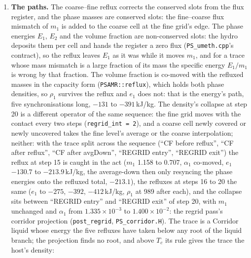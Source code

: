 \documentclass[11pt,a4paper]{article}
\newcommand{\code}[1]{\texttt{\small #1}}
\begin{document}
\begin{enumerate}[nosep]
      $-391$\,kJ/kg, the liquid's density untouched.  Then at the
      synchronisation into step 20 $\alpha_1$ jumps from $1.8\times10^{-3}$
      to $1.40\times10^{-2}$ while $m_1$ falls from 1.82 to 1.32, and
      $\rho_1$ collapses from 989 to 94\,kg/m$^3$; from there the cell
      is the degraded trace of follow-up 21.
\item \textbf{The paths.}  The coarse--fine reflux corrects the
      conserved slots from the flux register, and the phase masses are
      conserved slots: the fine--coarse flux mismatch of $m_1$ is added
      to the coarse cell at the fine grid's edge.  The phase energies
      $E_1$, $E_2$ and the volume fraction are non-conserved slots: the
      hydro deposits them per cell and hands the register a zero flux
      (\code{PS\_umeth.cpp}'s contract), so the reflux leaves $E_1$ as
      it was while it moves $m_1$, and for a trace whose mass mismatch
      is a large fraction of its mass the specific energy $E_1/m_1$ is
      wrong by that fraction.  The volume fraction is co-moved with the
      refluxed masses in the capacity form (\code{PSAMR::reflux}), which
      holds both phase densities, so $\rho_1$ survives the reflux and
      $e_1$ does not: that is the energy's path, five synchronisations
      long, $-131$ to $-391$\,kJ/kg.  The density's collapse at step 20
      is a different operator of the same sequence: the fine grid moves
      with the contact every two steps (\code{regrid\_int = 2}), and a
      coarse cell newly covered or newly uncovered takes the fine level's
      average or the coarse interpolation; neither: with the
      trace split across the sequence (``CF before reflux'', ``CF after
      reflux'', ``CF after avgDown'', ``REGRID entry'', ``REGRID exit'')
      the reflux at step 15 is caught in the act ($m_1$ 1.158 to 0.707,
      $\alpha_1$ co-moved, $e_1$ $-130.7$ to $-213.9$\,kJ/kg, the
      average-down then only resyncing the phase energies onto the
      refluxed total, $-213.1$), the refluxes at steps 16 to 20 the same
      ($e_1$ to $-275$, $-392$, $-412$\,kJ/kg, $\rho_1$ at 989 after
      each), and the collapse sits between ``REGRID entry'' and
      ``REGRID exit'' of step 20, with $m_1$ unchanged and $\alpha_1$
      from $1.335\times10^{-3}$ to $1.400\times10^{-2}$: the regrid pass's
      corridor projection (\code{post\_regrid}, \code{PS\_corridor.H}).
      The trace is a Corridor liquid whose energy the five refluxes have
      taken below any root of the liquid branch; the projection finds no
      root, and above $T_c$ its rule gives the trace the host's density:

\end{enumerate}
\end{document}
